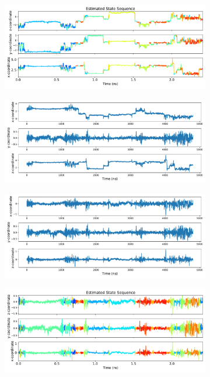 \documentclass{article}
\begin{document}
  \begin{figure}
    \centering
	\begin{subfigure}{0.6\textwidth}
	\includegraphics[width=\textwidth]{xyz_hmm.pdf}
		\caption{}\label{fig:xyz_hmm}
	\end{subfigure}  
		\begin{subfigure}{0.6\textwidth}
		\includegraphics[width=\textwidth]{y_zeroed.pdf}
		\caption{}\label{fig:y_zeroed}
	\end{subfigure}  	
	\begin{subfigure}{0.6\textwidth}
		\includegraphics[width=\textwidth]{xyz_zeroed.pdf}
		\caption{}\label{fig:xyz_zeroed}
	\end{subfigure}  		
	\begin{subfigure}{0.6\textwidth}
		\includegraphics[width=\textwidth]{zeroed_clustered_hmm.pdf}

\end{subfigure}
\end{figure}
\end{document}
